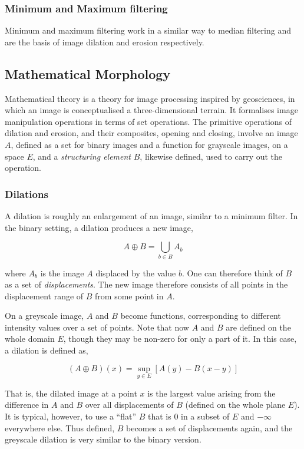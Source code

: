 \documentclass[11pt]{amsart}
\begin{document}
\subsubsection{Minimum and Maximum filtering}

Minimum and maximum filtering work in a similar way to median filtering and are the basis of image dilation and erosion respectively.

\subsection{Mathematical Morphology}

Mathematical theory is a theory for image processing inspired by geosciences, in which an image is conceptualised a three-dimensional terrain. It formalises image manipulation operations in terms of set operations. The primitive operations of dilation and erosion, and their composites, opening and closing, involve an image $A$, defined as a set for binary images and a function for grayscale images, on a space $E$, and a \emph{structuring element} $B$, likewise defined, used to carry out the operation.

\subsubsection{Dilations}

A dilation is roughly an enlargement of an image, similar to a minimum filter. In the binary setting, a dilation produces a new image,

$$A \oplus B = \bigcup_{b \in B} A_b$$

where $A_b$ is the image $A$ displaced by the value $b$. One can therefore think of $B$ as a set of \emph{displacements}. The new image therefore consists of all points in the displacement range of $B$ from some point in $A$.

On a greyscale image, $A$ and $B$ become functions, corresponding to different intensity values over a set of points. Note that now $A$ and $B$ are defined on the whole domain $E$, though they may be non-zero for only a part of it. In this case, a dilation is defined as,

$$(A \oplus B)(x) = \sup_{y \in E}[A(y) - B(x - y)]$$

That is, the dilated image at a point $x$ is the largest value arising from the difference in $A$ and $B$ over all displacements of $B$ (defined on the whole plane $E$). It is typical, however, to use a ``flat'' $B$ that is $0$ in a subset of $E$ and $-\infty$ everywhere else. Thus defined, $B$ becomes a set of displacements again, and the greyscale dilation is very similar to the binary version.
\end{document}
